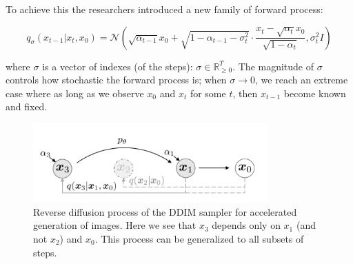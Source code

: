 To achieve this the researchers introduced a new family of forward process:

\begin{equation*}
    q_\sigma (x_{t-1} | x_t, x_0) = \mathcal{N} (\sqrt{\alpha_{t-1}} x_0 + \sqrt{1 - \alpha_{t-1} - \sigma_t^2} \cdot \frac{x_t - \sqrt{\alpha_t} x_0}{\sqrt{1 - \alpha_t}}, \sigma_t^2 I)
\end{equation*}

where $\sigma$ is a vector of indexes (of the steps): $\sigma \in \mathbb{R}^T_{\geq 0}$. The magnitude of $\sigma$ controls how stochastic the forward process is; when $\sigma \rightarrow 0$, we reach an extreme case where as long as we observe $x_0$ and $x_t$ for some $t$, then $x_{t-1}$ become known and fixed.





\begin{figure}
    \centering
    \includegraphics[width=0.8\textwidth]{images/diffusion_models/stable_diffusion/ddim_sampling_process.png}
    \caption{Reverse diffusion process of the DDIM sampler \cite{ddim} for accelerated generation of images. Here we see that $x_3$ depends only on $x_1$ (and not $x_2$) and $x_0$. This process can be generalized to all subsets of steps.}
    \label{fig:ddim_sampling_process}
\end{figure}

